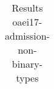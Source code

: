\begin{table}[htb]
{\begin{tabular}[tb]{llllllllllllllllllllllllllllllllllllllll}
\end{tabular}

}

\caption{Results oaei17-admission-non-binary-types}

\label{tbl:results}

\end{table}